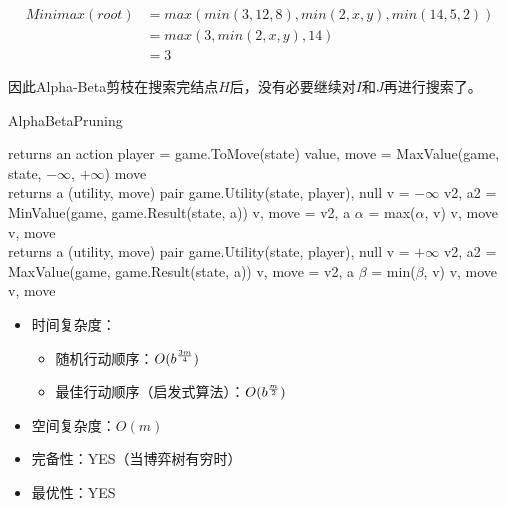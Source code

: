 \begin{align*}
    Minimax(root) & = max(min(3, 12, 8), min(2, x, y), min(14, 5, 2)) \\
                  & = max(3, min(2, x, y), 14)                        \\
                  & = 3
\end{align*}

因此Alpha-Beta剪枝在搜索完结点$ H $后，没有必要继续对$ I $和$ J $再进行搜索了。\\

\begin{algorithm}[H]
    \caption{AlphaBetaPruning}
    \begin{algorithmic}[1]
         returns an action
        \State player = game.ToMove(state)
        \State value, move = MaxValue(game, state, $ -\infty $, $ +\infty $)
        \State \Return move
        \EndProcedure
        \\
         returns a (utility, move) pair
        \State \Return game.Utility(state, player), null
        \EndIf
        \State v = $ - \infty $
        \State v2, a2 = MinValue(game, game.Result(state, a))
        \State v, move = v2, a
        \State $ \alpha $ = max($ \alpha $, v)
        \EndIf
        \State \Return v, move
        \EndIf
        \EndFor
        \State \Return v, move
        \EndProcedure
        \\
         returns a (utility, move) pair
        \State \Return game.Utility(state, player), null
        \EndIf
        \State v = $ + \infty $
        \State v2, a2 = MaxValue(game, game.Result(state, a))
        \State v, move = v2, a
        \State $ \beta $ = min($ \beta $, v)
        \EndIf
        \State \Return v, move
        \EndIf
        \EndFor
        \State \Return v, move
        \EndProcedure
    \end{algorithmic}
\end{algorithm}

\begin{itemize}
    \item 时间复杂度：
          \begin{itemize}
              \item 随机行动顺序：$ O(b^{3m \over 4}) $
              \item 最佳行动顺序（启发式算法）：$ O(b^{m \over 2}) $
          \end{itemize}
    \item 空间复杂度：$ O(m) $
    \item 完备性：YES（当博弈树有穷时）
    \item 最优性：YES
\end{itemize}

\newpage